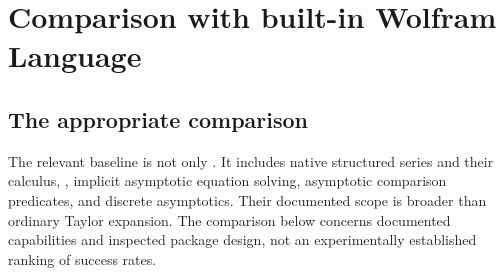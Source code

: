 \section{Comparison with built-in Wolfram Language}
\subsection{The appropriate comparison}
The relevant baseline is not only . It includes native structured series and their calculus, , implicit asymptotic equation solving, asymptotic comparison predicates, and discrete asymptotics. Their documented scope is broader than ordinary Taylor expansion. The comparison below concerns documented capabilities and inspected package design, not an experimentally established ranking of success rates.\cite{wl-series,wl-seriesdata,wl-inverse,wl-compose,wl-asymptotic,wl-solve,wl-discrete,wl-less}

